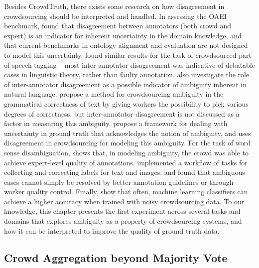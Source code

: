 Besides CrowdTruth, there exists some research on how disagreement in crowdsourcing should be interpreted and handled. In assessing the OAEI benchmark, \citet{cheatham2014conference} found that disagreement between annotators (both crowd and expert) is an indicator for inherent uncertainty in the domain knowledge, and that current benchmarks in ontology alignment and evaluation are not designed to model this uncertainty. \citet{plank-hovy-sogaard:2014:P14-2} found similar results for the task of crowdsourced part-of-speech tagging -- most inter-annotator disagreement was indicative of debatable cases in linguistic theory, rather than faulty annotation. \citet{Bayerl2011} also investigate the role of inter-annotator disagreement as a possible indicator of ambiguity inherent in natural language. \citet{lau2014measuring} propose a method for crowdsourcing ambiguity in the grammatical correctness of text by giving workers the possibility to pick various degrees of correctness, but inter-annotator disagreement is not discussed as a factor in measuring this ambiguity. \citet{schaekermann2016} propose a framework for dealing with uncertainty in ground truth that acknowledges the notion of ambiguity, and uses disagreement in crowdsourcing for modeling this ambiguity. For the task of word sense disambiguation, \citet{jurgens2013embracing} shows that, in modeling ambiguity, the crowd was able to achieve expert-level quality of annotations. \citet{Chang:2017:Revolt} implemented a workflow of tasks for collecting and correcting labels for text and images, and found that ambiguous cases cannot simply be resolved by better annotation guidelines or through worker quality control. Finally, \citet{lin2014re} show that often, machine learning classifiers can achieve a higher accuracy when trained with noisy crowdsourcing data. To our knowledge, this chapter presents the first experiment across several tasks and domains that explores ambiguity as a property of crowdsourcing systems, and how it can be interpreted to improve the quality of ground truth data.


\subsection{Crowd Aggregation beyond Majority Vote}

